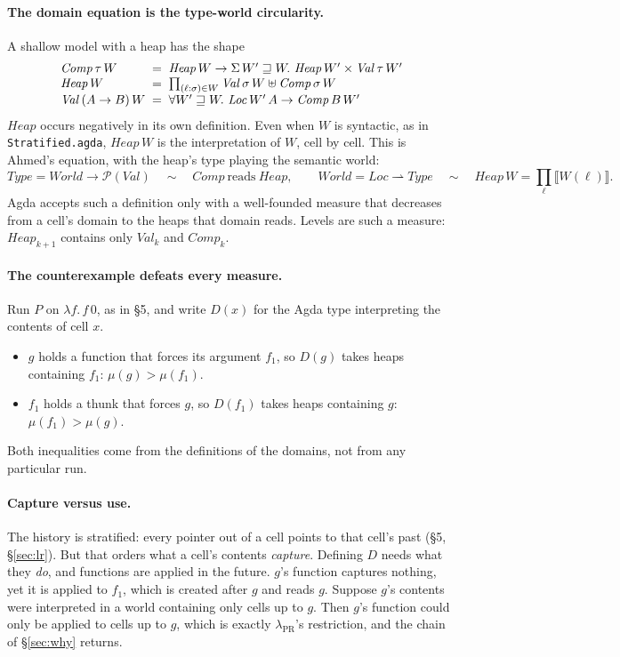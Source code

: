 \documentclass[11pt]{article}
\newcommand{\slam}[1]{\lambda #1.\,}
\newcommand{\ext}{\sqsupseteq}
\begin{document}
\paragraph{The domain equation is the type-world circularity.}
A shallow model with a heap has the shape
\[
\begin{array}{@{}l@{\;\;=\;\;}l@{}}
  \mathit{Comp}\,\tau\,W & \mathit{Heap}\,W \to
    \Sigma\,W' \ext W.\ \mathit{Heap}\,W' \times \mathit{Val}\,\tau\,W' \\
  \mathit{Heap}\,W & \prod_{(\ell : \sigma) \in W}
    \mathit{Val}\,\sigma\,W \uplus \mathit{Comp}\,\sigma\,W \\
  \mathit{Val}\,(A \to B)\,W & \forall W' \ext W.\
    \mathit{Loc}\,W'\,A \to \mathit{Comp}\,B\,W'
\end{array}
\]
$\mathit{Heap}$ occurs negatively in its own definition. Even when $W$ is
syntactic, as in \texttt{Stratified.agda}, $\mathit{Heap}\,W$ is the
interpretation of $W$, cell by cell. This is Ahmed's equation, with the
heap's type playing the semantic world:
\[
  \mathit{Type} = \mathit{World} \to \mathcal{P}(\mathit{Val})
  \quad\sim\quad \mathit{Comp}\ \text{reads}\ \mathit{Heap},
  \qquad
  \mathit{World} = \mathit{Loc} \rightharpoonup \mathit{Type}
  \quad\sim\quad \mathit{Heap}\,W = \textstyle\prod_\ell
    \llbracket W(\ell) \rrbracket.
\]
Agda accepts such a definition only with a well-founded measure that
decreases from a cell's domain to the heaps that domain reads. Levels are
such a measure: $\mathit{Heap}_{k+1}$ contains only $\mathit{Val}_k$ and
$\mathit{Comp}_k$.

\paragraph{The counterexample defeats every measure.}
Run $P$ on $\slam{f} f\,0$, as in \S5, and write $D(x)$ for the Agda type
interpreting the contents of cell $x$.
\begin{itemize}
  \item $g$ holds a function that forces its argument $f_1$, so $D(g)$ takes
    heaps containing $f_1$: $\mu(g) > \mu(f_1)$.
  \item $f_1$ holds a thunk that forces $g$, so $D(f_1)$ takes heaps
    containing $g$: $\mu(f_1) > \mu(g)$.
\end{itemize}
Both inequalities come from the definitions of the domains, not from any
particular run.

\paragraph{Capture versus use.}
The history is stratified: every pointer out of a cell points to that cell's
past (\S5, \S\ref{sec:lr}). But that orders what a cell's contents
\emph{capture}. Defining $D$ needs what they \emph{do}, and functions are
applied in the future. $g$'s function captures nothing, yet it is applied to
$f_1$, which is created after $g$ and reads $g$. Suppose $g$'s contents were
interpreted in a world containing only cells up to $g$. Then $g$'s function
could only be applied to cells up to $g$, which is exactly
$\lambda_{\mathrm{PR}}$'s restriction, and the chain of \S\ref{sec:why}
returns.
\end{document}
